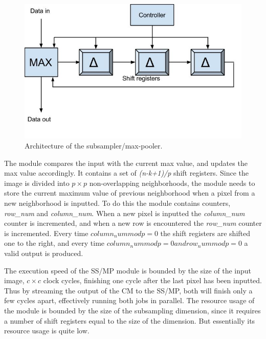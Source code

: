 \begin{figure}[h!]
  \centering
      \includegraphics[width=1.0\textwidth]{Figures/Method/submax}
  \caption{Architecture of the subsampler/max-pooler.}
\end{figure}

The module compares the input with the current max value, and updates the max value accordingly. It contains a set of \textit{(n-k+1)/p} shift registers. Since the image is divided into $ p \times p $ non-overlapping neighborhoods, the module needs to store the current maximum value of previous neighborhood when a pixel from a new neighborhood is inputted. To do this the module contains counters, \textit{row\_num} and \textit{column\_num}. When a new pixel is inputted the \textit{column\_num} counter is incremented, and when a new row is encountered the \textit{row\_num} counter is incremented. Every time $ column_num mod p = 0 $ the shift registers are shifted one to the right, and every time $ column_num mod p = 0 and row_num mod p = 0 $ a valid output is produced. 

The execution speed of the SS/MP module is bounded by the size of the input image, $ c \times c $ clock cycles, finishing one cycle after the last pixel has been inputted. 
Thus by streaming the output of the CM to the SS/MP, both will finish only a few cycles apart, effectively running both jobs in parallel. The resource usage of the module is bounded by the size of the subsampling dimension, since it requires a number of shift registers equal to the size of the dimension. But essentially its resource usage is quite low.  
